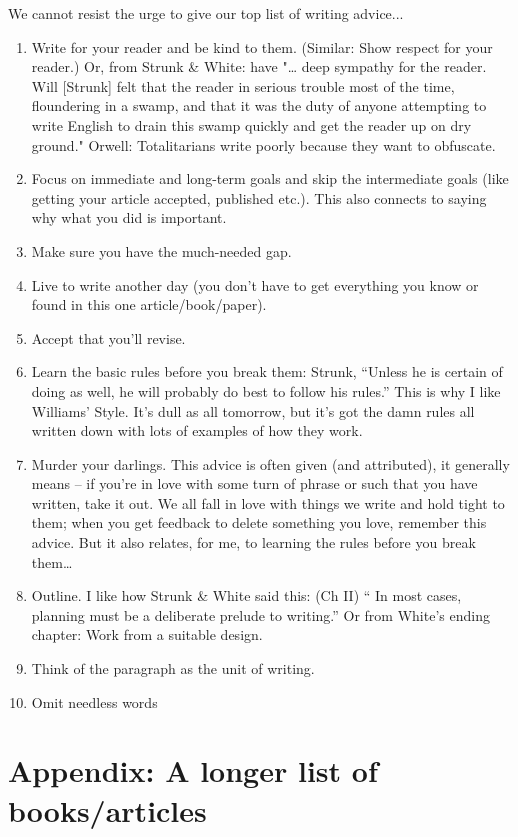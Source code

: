 \documentclass[11pt,letter]{article}
\begin{document}
We cannot resist the urge to give our top list of writing advice...
\begin{enumerate}
\item Write for your reader and be kind to them. (Similar: Show respect for your reader.) Or, from Strunk \& White: have "… deep sympathy for the reader. Will [Strunk] felt that the reader in serious trouble most of the time, floundering in a swamp, and that it was the duty of anyone attempting to write English to drain this swamp quickly and get the reader up on dry ground." Orwell: Totalitarians write poorly because they want to obfuscate.
\item Focus on immediate and long-term goals and skip the intermediate goals (like getting your article accepted, published etc.). This also connects to saying why what you did is important. 
\item Make sure you have the much-needed gap. 
\item Live to write another day (you don’t have to get everything you know or found in this one article/book/paper).
\item Accept that you’ll revise. 
\item Learn the basic rules before you break them: Strunk, “Unless he is certain of doing as well, he will probably do best to follow his rules.” This is why I like Williams’ Style. It’s dull as all tomorrow, but it’s got the damn rules all written down with lots of examples of how they work. 
\item Murder your darlings. This advice is often given (and attributed), it generally means – if you’re in love with some turn of phrase or such that you have written, take it out. We all fall in love with things we write and hold tight to them; when you get feedback to delete something you love, remember this advice. But it also relates, for me, to learning the rules before you break them…
\item Outline. I like how Strunk \& White said this: (Ch II) “ In most cases, planning must be a deliberate prelude to writing.” Or from White’s ending chapter: Work from a suitable design.
\item Think of the paragraph as the unit of writing. 
\item Omit needless words
\end{enumerate}

\section{Appendix: A longer list of books/articles}
\end{document}
